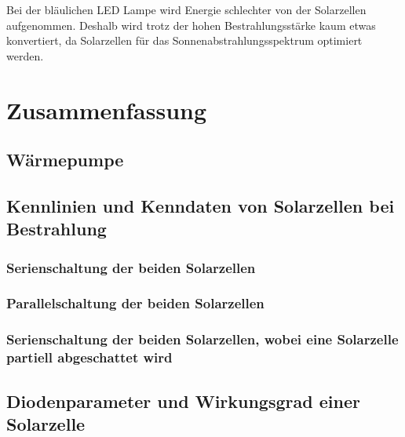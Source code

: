 \documentclass[12pt,english,ngerman]{scrartcl}
\begin{document}
Bei der bläulichen LED Lampe wird Energie schlechter von der Solarzellen
aufgenommen. Deshalb wird trotz der hohen Bestrahlungsstärke kaum etwas
konvertiert, da Solarzellen für das Sonnenabstrahlungsspektrum optimiert
werden.

\section{Zusammenfassung}\label{sec:zusammenfassung}

\subsection{Wärmepumpe}

\subsection{Kennlinien und Kenndaten von Solarzellen bei Bestrahlung}

\subsubsection{Serienschaltung der beiden Solarzellen}

\subsubsection{Parallelschaltung der beiden Solarzellen}

\subsubsection{Serienschaltung der beiden Solarzellen, wobei eine Solarzelle partiell abgeschattet wird}

\subsection{Diodenparameter und Wirkungsgrad einer Solarzelle}

\newpage
\printbibliography
\listoffigures
\listoftables
\end{document}
